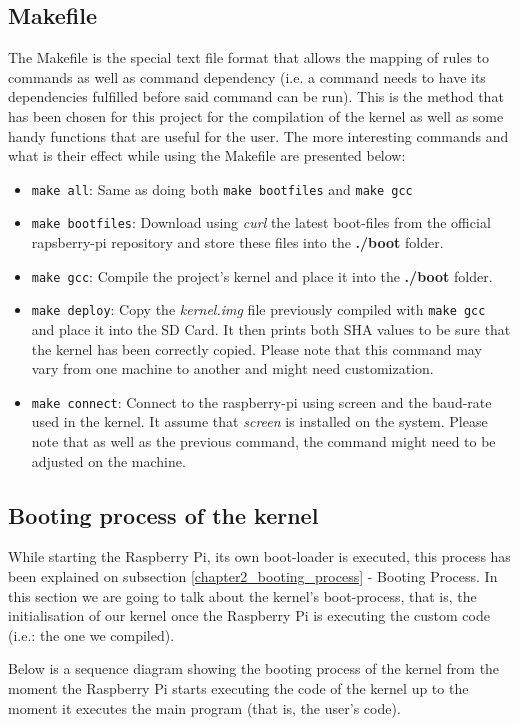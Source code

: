 \subsection{Makefile}
The Makefile is the special text file format that allows the mapping of rules to commands as well as command dependency (i.e. a command needs to have its dependencies fulfilled before said command can be run). This is the method that has been chosen for this project for the compilation of the kernel as well as some handy functions that are useful for the user. The more interesting commands and what is their effect while using the Makefile are presented below:
\begin{itemize}
	\item \texttt{make all}: Same as doing both \texttt{make bootfiles} and \texttt{make gcc}\cite{osdev_rpi_bare_bone}
	\item \texttt{make bootfiles}: Download using \textit{curl} the latest boot-files from the official rapsberry-pi repository and store these files into the \textbf{./boot} folder.
	\item \texttt{make gcc}: Compile the project's kernel and place it into the \textbf{./boot} folder.
	\item \texttt{make deploy}: Copy the \textit{kernel.img} file previously compiled with \texttt{make gcc} and place it into the SD Card. It then prints both SHA values to be sure that the kernel has been correctly copied. Please note that this command may vary from one machine to another and might need customization.
	\item \texttt{make connect}: Connect to the raspberry-pi using screen and the baud-rate used in the kernel. It assume that \textit{screen} is installed on the system. Please note that as well as the previous command, the command might need to be adjusted on the machine.
\end{itemize}


\subsection{Booting process of the kernel}
While starting the Raspberry Pi, its own boot-loader is executed, this process has been explained on subsection \ref{chapter2_booting_process} - Booting Process. In this section we are going to talk about the kernel's boot-process, that is, the initialisation of our kernel once the Raspberry Pi is executing the custom code (i.e.: the one we compiled).

Below is a sequence diagram showing the booting process of the kernel from the moment the Raspberry Pi starts executing the code of the kernel up to the moment it executes the main program (that is, the user's code).


